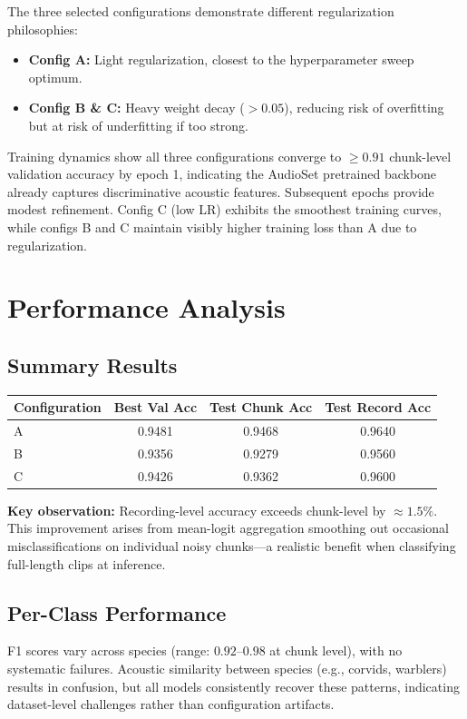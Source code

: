 \documentclass[11pt, a4paper]{article}
\begin{document}
\noindent
The three selected configurations demonstrate different regularization philosophies:
\begin{itemize}
  \item \textbf{Config A:} Light regularization, closest to the hyperparameter sweep optimum.
  \item \textbf{Config B \& C:} Heavy weight decay ($> 0.05$), reducing risk of overfitting but at risk of underfitting if too strong.
\end{itemize}

\noindent
Training dynamics show all three configurations converge to $\geq 0.91$ chunk-level validation accuracy by epoch 1, indicating the AudioSet pretrained backbone already captures discriminative acoustic features. Subsequent epochs provide modest refinement. Config C (low LR) exhibits the smoothest training curves, while configs B and C maintain visibly higher training loss than A due to regularization.

\section{Performance Analysis}

\subsection{Summary Results}
\begin{center}
\begin{tabular}{lccc}
  \toprule
  \textbf{Configuration} & \textbf{Best Val Acc} & \textbf{Test Chunk Acc} & \textbf{Test Record Acc} \\
  \midrule
  A & 0.9481 & 0.9468 & 0.9640 \\
  B & 0.9356 & 0.9279 & 0.9560 \\
  C & 0.9426 & 0.9362 & 0.9600 \\
  \bottomrule
\end{tabular}
\end{center}

\noindent
\textbf{Key observation:} Recording-level accuracy exceeds chunk-level by $\approx 1.5\%$. This improvement arises from mean-logit aggregation smoothing out occasional misclassifications on individual noisy chunks---a realistic benefit when classifying full-length clips at inference.

\subsection{Per-Class Performance}
F1 scores vary across species (range: $0.92$--$0.98$ at chunk level), with no systematic failures. Acoustic similarity between species (e.g., corvids, warblers) results in confusion, but all models consistently recover these patterns, indicating dataset-level challenges rather than configuration artifacts.
\end{document}
